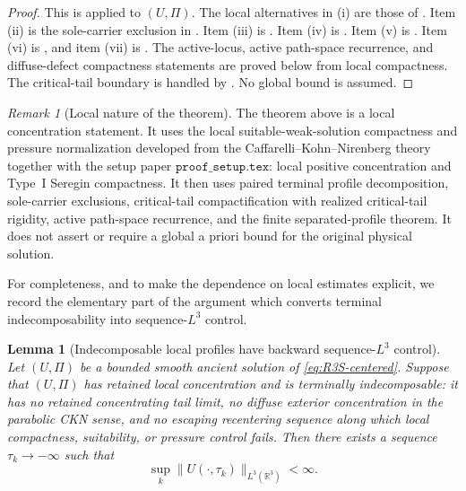 \documentclass[11pt]{amsart}
\numberwithin{equation}{section}
\theoremstyle{plain}
\newtheorem{lemma}[theorem]{Lemma}
\theoremstyle{definition}
\theoremstyle{remark}
\newtheorem{remark}[theorem]{Remark}
\begin{document}
\begin{proof}
This is  applied to
\((U,\Pi)\).  The local alternatives in (i) are those of
  .  Item (ii) is the sole-carrier exclusion
in .  Item (iii) is
.  Item (iv) is
.  Item (v) is
.  Item (vi) is
, and item (vii) is
   .  The active-locus,
   active path-space recurrence, and diffuse-defect compactness statements are
   proved below from local compactness.  The critical-tail boundary is handled
   by .
   No global bound is assumed.
\end{proof}

\begin{remark}[Local nature of the theorem]
\label{rem:R3S-local-nature}
The theorem above is a local concentration statement.  It uses the local
suitable-weak-solution compactness and pressure normalization developed from
the Caffarelli--Kohn--Nirenberg theory \cite{CKN1982} together with the
setup paper \(\texttt{proof\_setup.tex}\): local positive concentration
and Type~I Seregin compactness.  It then uses paired terminal
profile decomposition, sole-carrier exclusions, critical-tail compactification
with realized critical-tail rigidity, active path-space recurrence, and the
finite separated-profile theorem.  It does not assert or require a global a
priori bound for the original physical solution.
\end{remark}

For completeness, and to make the dependence on local estimates explicit, we
record the elementary part of the argument which converts terminal
indecomposability into sequence-\(L^3\) control.

\begin{lemma}[Indecomposable local profiles have backward sequence-\(L^3\) control]
\label{lem:R3S-atomic-L3}
Let \((U,\Pi)\) be a bounded smooth ancient solution of
\eqref{eq:R3S-centered}.  Suppose that \((U,\Pi)\) has retained local
concentration and is terminally indecomposable: it has no retained
concentrating tail limit, no diffuse exterior concentration in the parabolic
CKN sense, and no escaping recentering sequence along which local compactness,
suitability, or pressure control fails.  Then there
exists a sequence \(\tau_k\to-\infty\) such that
\begin{equation}\label{eq:R3S-atomic-L3}
   \sup_k \|U(\cdot,\tau_k)\|_{L^3(\mathbb R^3)}<\infty .
\end{equation}
\end{lemma}
\end{document}
